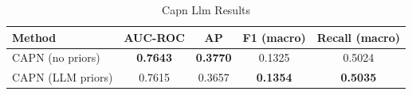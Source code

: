 \begin{table}[ht]
\centering
\caption{Capn Llm Results}
\label{tab:capn_llm}
\begin{tabular}{lcccc}
\toprule
Method & AUC-ROC & AP & F1 (macro) & Recall (macro) \\
\midrule
CAPN (no priors) & \textbf{0.7643} & \textbf{0.3770} & 0.1325 & 0.5024 \\
CAPN (LLM priors) & 0.7615 & 0.3657 & \textbf{0.1354} & \textbf{0.5035} \\
\bottomrule
\end{tabular}
\end{table}